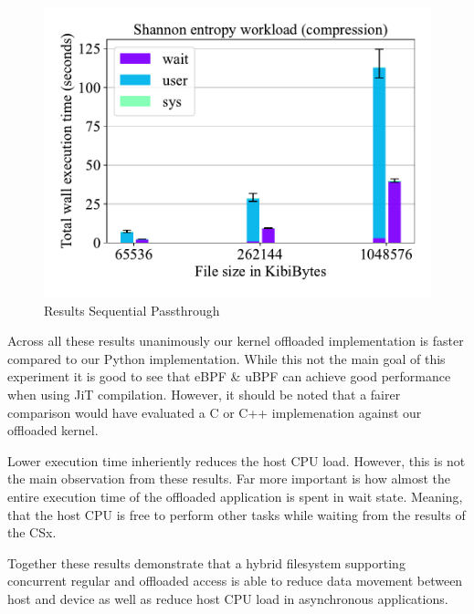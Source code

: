 \begin{figure}[h]
    \centering
	\includegraphics[width=1\textwidth]{resources/images/results-shannon-upper.pdf}
	\caption{Results Sequential Passthrough}
    \label{figure:shannonhigh}
\end{figure}

Across all these results unanimously our kernel offloaded implementation
is faster compared to our Python implementation. While this not the main goal of
this experiment it is good to see that eBPF \& uBPF can achieve good
performance when using JiT compilation. However, it should be noted that
a fairer comparison would have evaluated a C or C++ implemenation against our
offloaded kernel.

Lower execution time inheriently reduces the host CPU load. However, this is not
the main observation from these results. Far more important is how almost the
entire execution time of the offloaded application is spent in wait state.
Meaning, that the host CPU is free to perform other tasks while waiting from the
results of the CSx.

Together these results demonstrate that a hybrid filesystem supporting
concurrent regular and offloaded access is able to reduce data movement between
host and device as well as reduce host CPU load in asynchronous applications.


